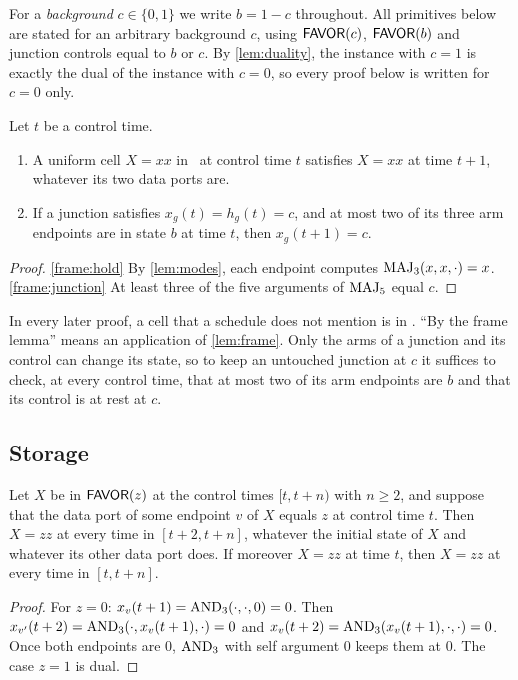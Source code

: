 For a \emph{background} $c\in\{0,1\}$ we write $b=1-c$ throughout. All primitives below are stated for
an arbitrary background $c$, using $\textsf{FAVOR}(c)$, $\textsf{FAVOR}(b)$ and junction controls equal to $b$ or $c$. By
\cref{lem:duality}, the instance with $c=1$ is exactly the dual of the instance with $c=0$, so every
proof below is written for $c=0$ only.

\begin{lemma}[Frame]\label{lem:frame}
Let $t$ be a control time.
\begin{enumerate}[label=(\alph*)]
\item\label{frame:hold} A uniform cell $X=xx$ in \HOLD\ at control time $t$ satisfies $X=xx$ at
  time $t+1$, whatever its two data ports are.
\item\label{frame:junction} If a junction satisfies $x_g(t)=h_g(t)=c$, and at most two of its three
  arm endpoints are in state $b$ at time $t$, then $x_g(t+1)=c$.
\end{enumerate}
\end{lemma}

\begin{proof}
\ref{frame:hold} By \cref{lem:modes}, each endpoint computes $\operatorname{MAJ}_3(x,x,\cdot)=x$.
\ref{frame:junction} At least three of the five arguments of $\operatorname{MAJ}_5$ equal $c$.
\end{proof}

In every later proof, a cell that a schedule does not mention is in \HOLD. ``By the frame lemma''
means an application of \cref{lem:frame}. Only the arms of a junction and its control can change
its state, so to keep an untouched junction at $c$ it suffices to check, at every control time, that
at most two of its arm endpoints are $b$ and that its control is at rest at $c$.

\subsection{Storage}

\begin{lemma}[Forcing]\label{lem:forcing}
Let $X$ be in $\textsf{FAVOR}(z)$ at the control times $[t,t+n)$ with $n\ge 2$, and suppose that the data port
of some endpoint $v$ of $X$ equals $z$ at control time $t$. Then $X=zz$ at every time in
$[t+2,t+n]$, whatever the initial state of $X$ and whatever its other data port does. If moreover
$X=zz$ at time $t$, then $X=zz$ at every time in $[t,t+n]$.
\end{lemma}

\begin{proof}
For $z=0$: $x_v(t+1)=\operatorname{AND}_3(\cdot,\cdot,0)=0$. Then $x_{v'}(t+2)=\operatorname{AND}_3(\cdot,x_v(t+1),\cdot)=0$
and $x_v(t+2)=\operatorname{AND}_3(x_v(t+1),\cdot,\cdot)=0$. Once both endpoints are $0$, $\operatorname{AND}_3$ with self
argument $0$ keeps them at $0$. The case $z=1$ is dual.
\end{proof}

